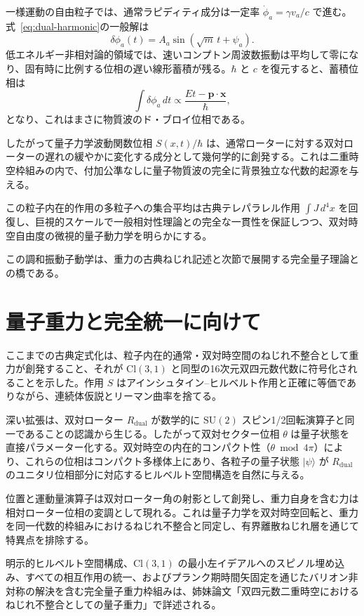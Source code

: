 \documentclass[dvipdfmx,a4paper]{article}
\begin{document}
一様運動の自由粒子では、通常ラピディティ成分は一定率 $\dot{\phi}_a = \gamma v_a/c$ で進む。式~\eqref{eq:dual-harmonic}の一般解は
\[
\delta\phi_a(t) = A_a \sin(\sqrt{m}\, t + \psi_a).
\]
低エネルギー非相対論的領域では、速いコンプトン周波数振動は平均して零になり、固有時に比例する位相の遅い線形蓄積が残る。$\hbar$ と $c$ を復元すると、蓄積位相は
\[
\int \delta\phi_a \, dt \propto \frac{E t - \mathbf{p} \cdot \mathbf{x}}{\hbar},
\]
となり、これはまさに物質波のド・ブロイ位相である。

したがって量子力学波動関数位相 $S(x,t)/\hbar$ は、通常ローターに対する双対ローターの遅れの緩やかに変化する成分として幾何学的に創発する。これは二重時空枠組みの内で、付加公準なしに量子物質波の完全に背景独立な代数的起源を与える。

この粒子内在的作用の多粒子への集合平均は古典テレパラレル作用 $\int J \, d^4x$ を回復し、巨視的スケールで一般相対性理論との完全な一貫性を保証しつつ、双対時空自由度の微視的量子動力学を明らかにする。

この調和振動子動学は、重力の古典ねじれ記述と次節で展開する完全量子理論との橋である。

\section{量子重力と完全統一に向けて}
\label{sec:quantumgravity}

ここまでの古典定式化は、粒子内在的通常・双対時空間のねじれ不整合として重力が創発すること、それが $\mathrm{Cl}(3,1)$ と同型の16次元双四元数代数に符号化されることを示した。作用 $S$ はアインシュタイン--ヒルベルト作用と正確に等価でありながら、連続体仮説とリーマン曲率を捨てる。

深い拡張は、双対ローター $R_\text{dual}$ が数学的に $\mathrm{SU}(2)$ スピン1/2回転演算子と同一であることの認識から生じる。したがって双対セクター位相 $\theta$ は量子状態を直接パラメーター化する。双対時空の内在的コンパクト性（$\theta \bmod 4\pi$）により、これらの位相はコンパクト多様体上にあり、各粒子の量子状態 $|\psi\rangle$ が $R_\text{dual}$ のユニタリ位相部分に対応するヒルベルト空間構造を自然に与える。

位置と運動量演算子は双対ローター角の射影として創発し、重力自身を含む力は相対ローター位相の変調として現れる。これは量子力学を双対時空回転と、重力を同一代数的枠組みにおけるねじれ不整合と同定し、有界離散ねじれ層を通じて特異点を排除する。

明示的ヒルベルト空間構成、$\mathrm{Cl}(3,1)$ の最小左イデアルへのスピノル埋め込み、すべての相互作用の統一、およびプランク期時間矢固定を通じたバリオン非対称の解決を含む完全量子重力枠組みは、姉妹論文「双四元数二重時空におけるねじれ不整合としての量子重力」\cite{dst-quantum-gravity}で詳述される。
\end{document}
